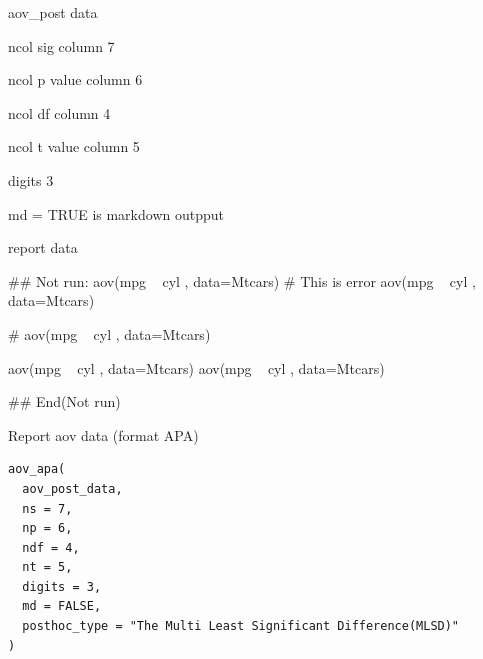 \documentclass[a4paper]{book}
\begin{document}
%
\begin{Arguments}
\begin{ldescription}
\item[\code{aov\_post\_data}] aov\_post data

\item[\code{ns}] ncol sig column 7

\item[\code{np}] ncol p value column 6

\item[\code{ndf}] ncol df column 4

\item[\code{nt}] ncol t value column 5

\item[\code{digits}] digits 3

\item[\code{md}] md = TRUE is markdown outpput
\end{ldescription}
\end{Arguments}
%
\begin{Value}
report data
\end{Value}
%
\begin{Examples}
\begin{ExampleCode}
\#\# Not run: 
aov(mpg ~ cyl , data=Mtcars)%
# This is error
aov(mpg ~ cyl , data=Mtcars)%

# aov(mpg ~ cyl , data=Mtcars)%

aov(mpg ~ cyl , data=Mtcars)%
aov(mpg ~ cyl , data=Mtcars)%


## End(Not run)

\end{ExampleCode}
\end{Examples}
%
\begin{Description}
Report aov data (format APA)
\end{Description}
%
\begin{Usage}
\begin{verbatim}
aov_apa(
  aov_post_data,
  ns = 7,
  np = 6,
  ndf = 4,
  nt = 5,
  digits = 3,
  md = FALSE,
  posthoc_type = "The Multi Least Significant Difference(MLSD)"
)
\end{verbatim}
\end{Usage}
%
\end{document}
